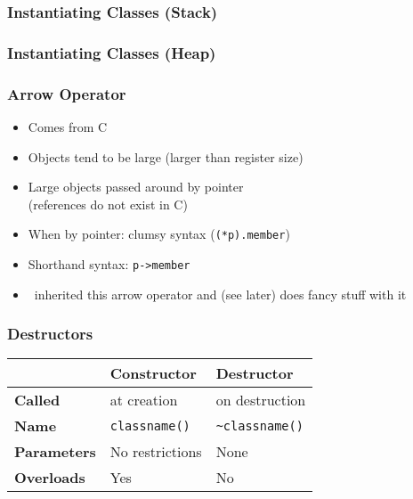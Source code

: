 \begin{frame}
  \frametitle{Instantiating Classes (Stack)}
\end{frame}

\begin{frame}
  \frametitle{Instantiating Classes (Heap)}
  \begin{overprint}
  \end{overprint}
\end{frame}

\begin{frame}
  \frametitle{Arrow Operator}
  \begin{itemize}
    \item Comes from C
    \item Objects tend to be large (larger than register size)
    \item Large objects passed around by pointer \\ (references do not exist in C)
    \item When by pointer: clumsy syntax ({\tt (*p).member})
    \item Shorthand syntax: {\tt p->member}
    \item \cpp\ inherited this arrow operator and (see later) does fancy stuff with it
  \end{itemize}
\end{frame}

\begin{frame}
  \frametitle{Destructors}
  \begin{center}
    \begin{tabular}{lll}
      & \textbf{Constructor} & \textbf{Destructor} \\
      \toprule
      \textbf{Called} & at creation & on destruction \\
      \textbf{Name} & {\tt classname()} & {\tt \~{}classname()} \\
      \textbf{Parameters} & No restrictions & None \\
      \textbf{Overloads} & Yes & No \\
    \end{tabular}
  \end{center}
  \vskip5mm
\end{frame}

